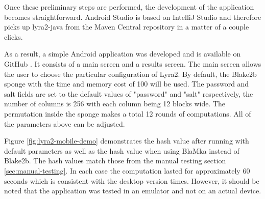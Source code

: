 Once these preliminary steps are performed, the development of the application becomes straightforward. Android Studio is based on IntelliJ Studio and therefore picks up lyra2-java from the Maven Central repository in a matter of a couple clicks.

As a result, a simple Android application was developed and is available on GitHub \cite{github:2017:lyra2-mobile}. It consists of a main screen and a results screen. The main screen allows the user to choose the particular configuration of Lyra2. By default, the Blake2b sponge with the time and memory cost of 100 will be used. The password and salt fields are set to the default values of "password" and "salt" respectively, the number of columns is 256 with each column being 12 blocks wide. The permutation inside the sponge makes a total 12 rounds of computations. All of the parameters above can be adjusted.

Figure \ref{fig:lyra2-mobile-demo} demonstrates the hash value after running with default parameters as well as the hash value when using BlaMka instead of Blake2b. The hash values match those from the manual testing section \ref{sec:manual-testing}. In each case the computation lasted for approximately 60 seconds which is consistent with the desktop version times. However, it should be noted that the application was tested in an emulator and not on an actual device.

